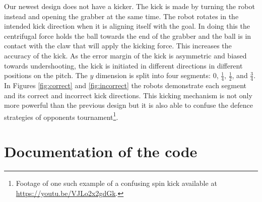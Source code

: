 \documentclass[a4paper,12pt]{article}
\begin{document}
Our newest design does not have a kicker. The kick is made by turning the robot instead and opening the grabber at the same time.
The robot rotates in the intended kick direction when it is aligning itself with the goal. In doing this the centrifugal force holds the ball towards the end of the grabber and the ball is in contact with the claw that will apply the kicking force. This increases the accuracy of the kick. As the error margin of the kick is asymmetric and biased towards undershooting, the kick is initiated in different directions in different positions on the pitch. The $y$ dimension is split into four segments: $0$, $\frac{1}{4}$, $\frac{1}{2}$, and $\frac{3}{4}$. In Figures \ref{fig:correct} and \ref{fig:incorrect} the robots demonstrate each segment and its correct and incorrect kick directions. This kicking mechanism is not only more powerful than the previous design but it is also able to confuse the defence strategies of opponents tournament\footnote{Footage of one such example of a confusing spin kick available at \url{https://youtu.be/VJLo2x2gdGk}.}.

\section{Documentation of the code}
\end{document}
